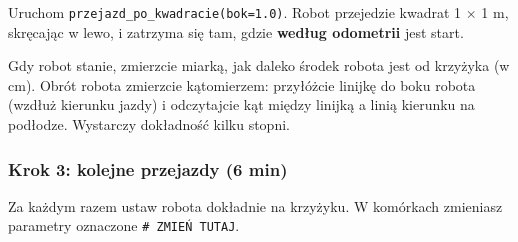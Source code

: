 Uruchom \texttt{przejazd\_po\_kwadracie(bok=1.0)}. Robot przejedzie kwadrat 1 × 1 m, skręcając w lewo, i zatrzyma się tam, gdzie \textbf{według odometrii} jest start.

Gdy robot stanie, zmierzcie miarką, jak daleko środek robota jest od krzyżyka (w cm). Obrót robota zmierzcie kątomierzem: przyłóżcie linijkę do boku robota (wzdłuż kierunku jazdy) i odczytajcie kąt między linijką a linią kierunku na podłodze. Wystarczy dokładność kilku stopni.

\subsubsection{Krok 3: kolejne przejazdy (6 min)}\label{krok-3-kolejne-przejazdy-6-min}

Za każdym razem ustaw robota dokładnie na krzyżyku. W komórkach zmieniasz parametry oznaczone \texttt{\#\ ZMIEŃ\ TUTAJ}.

